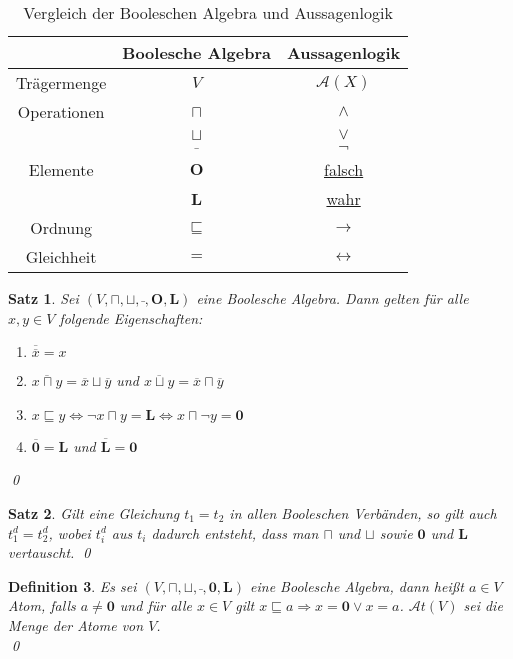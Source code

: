 \documentclass[ngerman]{scrartcl}
\theoremstyle{custom}
\newtheorem{mdef}{Definition} \numberwithin{mdef}{subsection}
\newtheorem{ms}[mdef]{Satz}
\newcommand{\ax}{\mathcal{A}(X)}
\newcommand{\0}{\mathbf{0}}
\newcommand{\1}{\mathbf{L}}
\newcommand{\at}{\mathcal{A}t}
\begin{document}
\begin{table}[h]
\center
\begin{tabular}{c|c|c}
& Boolesche Algebra & Aussagenlogik \\
\hline Tr\"agermenge & $V$ & $\ax$ \\
Operationen & $\sqcap$ & $\wedge$ \\
& $\sqcup$ & $\vee$ \\
& $\bar ~$ & $\neg$ \\
Elemente & $\mathbf{O}$ & \underline{falsch} \\
& $\mathbf{L}$& \underline{wahr}\\
Ordnung & $\sqsubseteq$ & $\rightarrow$ \\
Gleichheit & $=$ & $\leftrightarrow$
\end{tabular}
\caption{Vergleich der Booleschen Algebra und Aussagenlogik}
\end{table}

\begin{ms} \label{s127}
Sei $(V, \sqcap, \sqcup, \bar ~, \mathbf{O}, \mathbf{L})$ eine
Boolesche Algebra. Dann gelten f\"ur alle $x,y \in V$ folgende
Eigenschaften:
\begin{enumerate}
\item $\overline{\overline{x}} = x$
\item $\overline{x \sqcap y} = \overline{x} \sqcup \overline{y}$ und
  $\overline{x \sqcup y} = \overline{x} \sqcap \overline{y}$
\item $x \sqsubseteq y \Leftrightarrow \neg x \sqcap y = \mathbf{L}
  \Leftrightarrow x \sqcap \neg y = \mathbf{0}$
\item $\overline{\mathbf{0}} = \mathbf{L}$ und $\overline{\mathbf{L}}
  = \mathbf{0}$
\end{enumerate}
\qed
\end{ms}

\begin{ms}
Gilt eine Gleichung $t_1 = t_2$ in allen Booleschen Verb\"anden, so
gilt auch $t_1^d = t_2^d$, wobei $t_i^d$ aus $t_i$ dadurch entsteht,
dass man $\sqcap$ und $\sqcup$ sowie $\0$ und $\1$ vertauscht.
\qed
\end{ms}

\begin{mdef}
Es sei $(V,\sqcap, \sqcup, \bar~, \0, \1)$ eine Boolesche Algebra,
dann hei\ss t $a \in V$ \emph{Atom}, falls $a \not= \0$ und
f\"ur alle $x \in V$ gilt $x \sqsubseteq a \Rightarrow x = \0 \vee x =
a$. $\at(V)$ sei die Menge der Atome von $V$.\\
\qed
\end{mdef}
\end{document}
